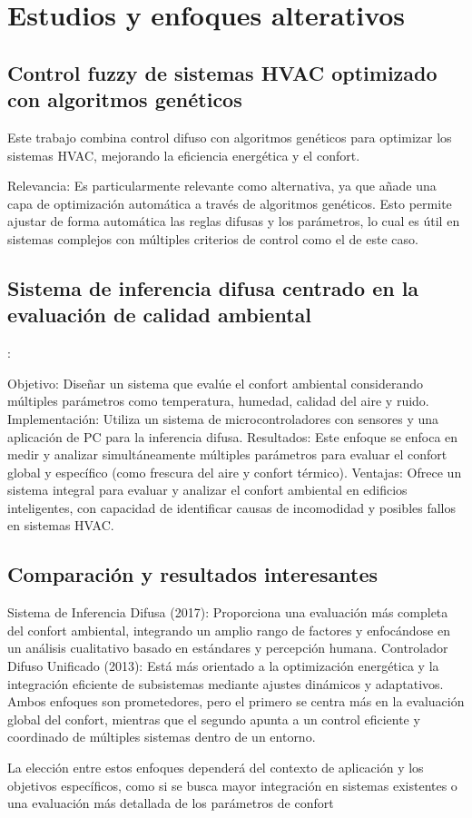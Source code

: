 \section{Estudios y enfoques alterativos}


\subsection{Control fuzzy de sistemas HVAC optimizado con algoritmos genéticos}
Este trabajo combina control difuso con algoritmos genéticos para optimizar los sistemas HVAC, mejorando la eficiencia energética y el confort. \parencite{alcala2003fuzzy}

Relevancia: Es particularmente relevante como alternativa, ya que añade una capa de optimización automática a través de algoritmos genéticos. Esto permite ajustar de forma automática las reglas difusas y los parámetros, lo cual es útil en sistemas complejos con múltiples criterios de control como el de este caso.


\subsection{Sistema de inferencia difusa centrado en la evaluación de calidad ambiental}
: \parencite{jablonski2018fuzzy}

Objetivo: Diseñar un sistema que evalúe el confort ambiental considerando múltiples parámetros como temperatura, humedad, calidad del aire y ruido.
Implementación: Utiliza un sistema de microcontroladores con sensores y una aplicación de PC para la inferencia difusa.
Resultados: Este enfoque se enfoca en medir y analizar simultáneamente múltiples parámetros para evaluar el confort global y específico (como frescura del aire y confort térmico).
Ventajas: Ofrece un sistema integral para evaluar y analizar el confort ambiental en edificios inteligentes, con capacidad de identificar causas de incomodidad y posibles fallos en sistemas HVAC.


\subsection{Comparación y resultados interesantes}
Sistema de Inferencia Difusa (2017): Proporciona una evaluación más completa del confort ambiental, integrando un amplio rango de factores y enfocándose en un análisis cualitativo basado en estándares y percepción humana.
Controlador Difuso Unificado (2013): Está más orientado a la optimización energética y la integración eficiente de subsistemas mediante ajustes dinámicos y adaptativos.
Ambos enfoques son prometedores, pero el primero se centra más en la evaluación global del confort, mientras que el segundo apunta a un control eficiente y coordinado de múltiples sistemas dentro de un entorno.


La elección entre estos enfoques dependerá del contexto de aplicación y los objetivos específicos, como si se busca mayor integración en sistemas existentes o una evaluación más detallada de los parámetros de confort